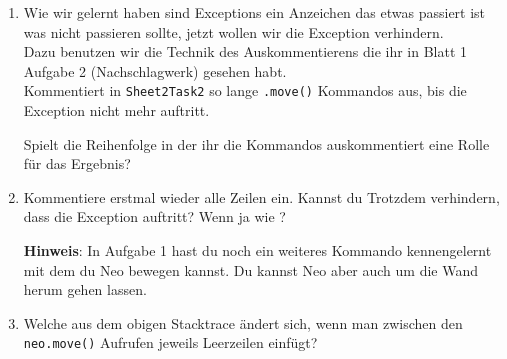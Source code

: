 \begin{enumerate}[label=\alph*)]
    \item Wie wir gelernt haben sind Exceptions ein Anzeichen das etwas passiert ist was nicht passieren sollte, jetzt wollen wir die Exception verhindern.\\
        Dazu benutzen wir die Technik des Auskommentierens die ihr in Blatt 1 Aufgabe 2 (Nachschlagwerk) gesehen habt.\\
        Kommentiert in \lstinline{Sheet2Task2} so lange \lstinline{.move()} Kommandos aus, bis die Exception nicht mehr auftritt.

        Spielt die Reihenfolge in der ihr die Kommandos auskommentiert eine Rolle für das Ergebnis?
    \item Kommentiere erstmal wieder alle Zeilen ein.
        Kannst du Trotzdem verhindern, dass die Exception auftritt?
        Wenn ja wie ?

    \textbf{Hinweis}: In Aufgabe 1 hast du noch ein weiteres Kommando kennengelernt mit dem du Neo bewegen kannst.
        Du kannst Neo aber auch um die Wand herum gehen lassen.
    \item \optional Welche  aus dem obigen Stacktrace ändert sich, wenn man zwischen den \lstinline{neo.move()} Aufrufen jeweils Leerzeilen einfügt?
\end{enumerate}
